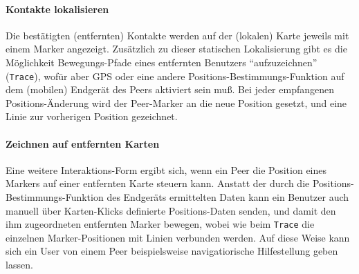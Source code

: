 \paragraph{Kontakte lokalisieren}\label{LOCALIZE_CONTACTS}
Die bestätigten (entfernten) Kontakte werden auf der (lokalen) Karte jeweils mit einem Marker angezeigt.
Zusätzlich zu dieser statischen Lokalisierung gibt es die Möglichkeit Bewegungs-Pfade eines entfernten Benutzers "`aufzuzeichnen"' (\texttt{Trace}), wofür aber GPS oder eine andere Positions-Bestimmungs-Funktion auf dem (mobilen) Endgerät des Peers aktiviert sein muß. Bei jeder empfangenen Positions-Änderung wird der Peer-Marker an die neue Position gesetzt, und eine Linie zur vorherigen Position gezeichnet.
 
\paragraph{Zeichnen auf entfernten Karten}\label{REMOTEDRAW}
Eine weitere Interaktions-Form ergibt sich, wenn ein Peer die Position eines Markers auf einer entfernten Karte steuern kann. Anstatt der durch die Positions-Bestimmungs-Funktion des Endgeräts ermittelten Daten kann ein Benutzer auch manuell über Karten-Klicks definierte Positions-Daten senden, und damit den ihm zugeordneten entfernten Marker bewegen, wobei wie beim \texttt{Trace} die einzelnen Marker-Positionen mit Linien verbunden werden.
Auf diese Weise kann sich ein User von einem Peer beispielsweise navigatiorische Hilfestellung geben lassen.

